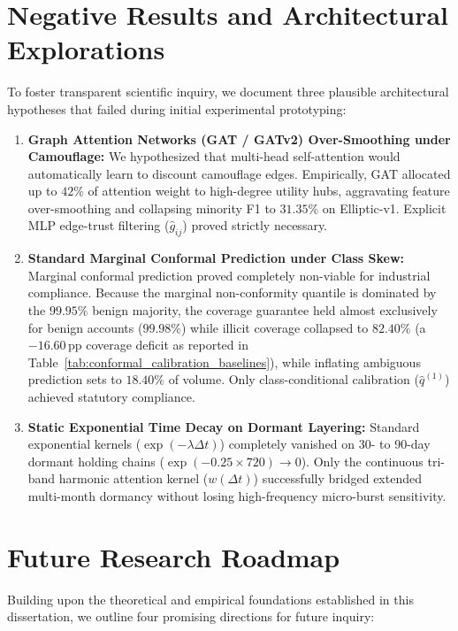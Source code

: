 \section{Negative Results and Architectural Explorations}
To foster transparent scientific inquiry, we document three plausible architectural hypotheses that failed during initial experimental prototyping:
\begin{enumerate}
    \item \textbf{Graph Attention Networks (GAT / GATv2) Over-Smoothing under Camouflage:} We hypothesized that multi-head self-attention would automatically learn to discount camouflage edges. Empirically, GAT allocated up to $42\%$ of attention weight to high-degree utility hubs, aggravating feature over-smoothing and collapsing minority F1 to $31.35\%$ on Elliptic-v1. Explicit MLP edge-trust filtering ($\hat{g}_{ij}$) proved strictly necessary.
    \item \textbf{Standard Marginal Conformal Prediction under Class Skew:} Marginal conformal prediction proved completely non-viable for industrial compliance. Because the marginal non-conformity quantile is dominated by the $99.95\%$ benign majority, the coverage guarantee held almost exclusively for benign accounts ($99.98\%$) while illicit coverage collapsed to $82.40\%$ (a $-16.60\,\text{pp}$ coverage deficit as reported in Table~\ref{tab:conformal_calibration_baselines}), while inflating ambiguous prediction sets to $18.40\%$ of volume. Only class-conditional calibration ($\hat{q}^{(1)}$) achieved statutory compliance.
    \item \textbf{Static Exponential Time Decay on Dormant Layering:} Standard exponential kernels ($\exp(-\lambda \Delta t)$) completely vanished on 30- to 90-day dormant holding chains ($\exp(-0.25 \times 720) \to 0$). Only the continuous tri-band harmonic attention kernel ($w(\Delta t)$) successfully bridged extended multi-month dormancy without losing high-frequency micro-burst sensitivity.
\end{enumerate}

\section{Future Research Roadmap}
Building upon the theoretical and empirical foundations established in this dissertation, we outline four promising directions for future inquiry:

